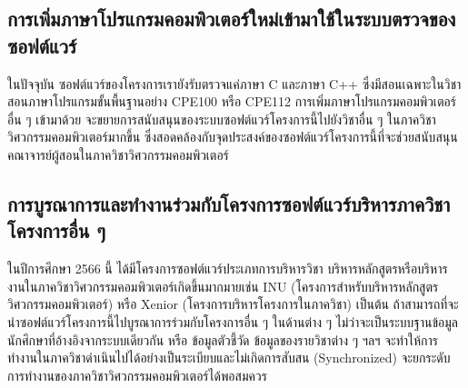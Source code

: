 \documentclass[12pt,one side,openright,a4paper]{cpe-thesis-th}
\newcommand{\thaijustify}[1]{%
  \par\hspace{30pt}\justifying
  #1
}
\begin{document}
\subsection{การเพิ่มภาษาโปรแกรมคอมพิวเตอร์ใหม่เข้ามาใช้ในระบบตรวจของซอฟต์แวร์}
\thaijustify{
  ในปัจจุบัน ซอฟต์แวร์ของโครงการเรายังรับตรวจแค่ภาษา C และภาษา C++ ซึ่งมีสอนเฉพาะในวิชาสอนภาษาโปรแกรมขั้นพื้นฐานอย่าง CPE100 หรือ CPE112 การเพิ่มภาษาโปรแกรมคอมพิวเตอร์อื่น ๆ เข้ามาด้วย จะขยายการสนับสนุนของระบบซอฟต์แวร์โครงการนี้ไปยังวิชาอื่น ๆ ในภาควิชาวิศวกรรมคอมพิวเตอร์มากขึ้น ซึ่งสอดคล้องกับจุดประสงค์ของซอฟต์แวร์โครงการนี้ที่จะช่วยสนับสนุนคณาจารย์ผู้สอนในภาควิชาวิศวกรรมคอมพิวเตอร์
}
\subsection{การบูรณาการและทำงานร่วมกับโครงการซอฟต์แวร์บริหารภาควิชาโครงการอื่น ๆ}
\thaijustify{
  ในปีการศึกษา 2566 นี้ ได้มีโครงการซอฟต์แวร์ประเภทการบริหารวิชา บริหารหลักสูตรหรือบริหารงานในภาควิชาวิศวกรรมคอมพิวเตอร์เกิดขึ้นมากมายเช่น INU (โครงการสำหรับบริหารหลักสูตรวิศวกรรมคอมพิวเตอร์) หรือ Xenior (โครงการบริหารโครงการในภาควิชา) เป็นต้น ถ้าสามารถที่จะนำซอฟต์แวร์โครงการนี้ไปบูรณาการร่วมกับโครงการอื่น ๆ ในด้านต่าง ๆ ไม่ว่าจะเป็นระบบฐานข้อมูลนักศึกษาที่อ้างอิงจากระบบเดียวกัน หรือ ข้อมูลตัวชี้วัด ข้อมูลของรายวิชาต่าง ๆ ฯลฯ จะทำให้การทำงานในภาควิชาดำเนินไปได้อย่างเป็นระเบียบและไม่เกิดการสับสน (Synchronized) จะยกระดับการทำงานของภาควิชาวิศวกรรมคอมพิวเตอร์ได้พอสมควร
}


\makeatletter
\g@addto@macro{\UrlBreaks}{\UrlOrds}
\makeatother

\printbibliography[heading=bibintoc,title={บรรณานุกรม}]


% 

% 
\end{document}
